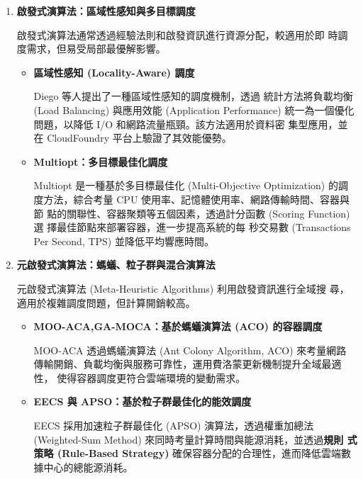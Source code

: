 \documentclass[12pt,a4paper]{article}
\begin{document}
\begin{enumerate}[label={(\zhdig*)}, leftmargin=2\parindent, listparindent=\parindent]
\begin{enumerate}[label={(\arabic*)}, leftmargin=\parindent, listparindent=\parindent]
\begin{enumerate}[label={(\zhdig*)}, leftmargin=\parindent, listparindent=\parindent]

\item \textbf{啟發式演算法：區域性感知與多目標調度}

啟發式演算法通常透過經驗法則和啟發資訊進行資源分配，較適用於即
時調度需求，但易受局部最優解影響。
\begin{itemize}[leftmargin=\parindent, listparindent=\parindent]
    \item \textbf{
        \cite{12} 區域性感知 (Locality-Aware) 調度}

    Diego 等人提出了一種區域性感知的調度機制，透過
    統計方法將負載均衡 (Load Balancing) 與應用效能 (Application Performance)
    統一為一個優化問題，以降低 I/O 和網路流量瓶頸。該方法適用於資料密
    集型應用，並在 CloudFoundry 平台上驗證了其效能優勢。
    \item \textbf{\cite{13} Multiopt：多目標最佳化調度}

    Multiopt 是一種基於多目標最佳化 (Multi-Objective Optimization) 的調
    度方法，綜合考量 CPU 使用率、記憶體使用率、網路傳輸時間、容器與節
    點的關聯性、容器聚類等五個因素，透過計分函數 (Scoring Function) 選
    擇最佳節點來部署容器，進一步提高系統的每
    秒交易數 (Transactions Per Second, TPS) 並降低平均響應時間。

\end{itemize}
\item \textbf{
    元啟發式演算法：螞蟻、粒子群與混合演算法
}

元啟發式演算法 (Meta-Heuristic Algorithms) 利用啟發資訊進行全域搜
尋，適用於複雜調度問題，但計算開銷較高。
\begin{itemize}[leftmargin=\parindent, listparindent=\parindent]
    \item \textbf{\cite{14} MOO-ACA,GA-MOCA：基於螞蟻演算法 (ACO) 的容器調度}

    MOO-ACA 透過螞蟻演算法 (Ant Colony Algorithm, ACO) 來考量網路
    傳輸開銷、負載均衡與服務可靠性，運用費洛蒙更新機制提升全域最適性，
    使得容器調度更符合雲端環境的變動需求。

    \item \textbf{
        \cite{15} EECS 與 APSO：基於粒子群最佳化的能效調度
    }

    EECS 採用加速粒子群最佳化 (APSO) 演算法，透過權重加總法
    (Weighted-Sum Method) 來同時考量計算時間與能源消耗，並透過\textbf{規則
    式策略 (Rule-Based Strategy) }確保容器分配的合理性，進而降低雲端數
    據中心的總能源消耗。


\end{itemize}
\end{enumerate}
\end{enumerate}
\end{enumerate}
\end{document}
